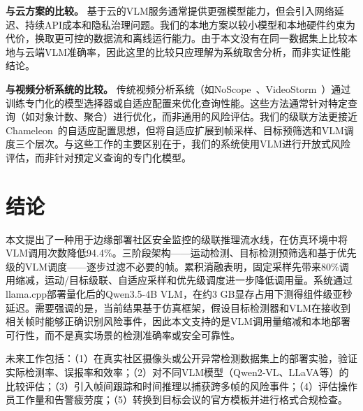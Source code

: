 \documentclass[a4paper,10pt]{ctexart}
\begin{document}
\textbf{与云方案的比较。}
基于云的VLM服务通常提供更强模型能力，但会引入网络延迟、持续API成本和隐私治理问题。我们的本地方案以较小模型和本地硬件约束为代价，换取更可控的数据流和离线运行能力。由于本文没有在同一数据集上比较本地与云端VLM准确率，因此这里的比较只应理解为系统取舍分析，而非实证性能结论。

\textbf{与视频分析系统的比较。}
传统视频分析系统（如NoScope~\cite{noscope2017}、VideoStorm~\cite{videostorm2017}）通过训练专门化的模型选择器或自适应配置来优化查询性能。这些方法通常针对特定查询（如对象计数、聚合）进行优化，而非通用的风险评估。我们的级联方法更接近Chameleon~\cite{chameleon2020}的自适应配置思想，但将自适应扩展到帧采样、目标预筛选和VLM调度三个层次。与这些工作的主要区别在于，我们的系统使用VLM进行开放式风险评估，而非针对预定义查询的专门化模型。

\section{结论}

本文提出了一种用于边缘部署社区安全监控的级联推理流水线，在仿真环境中将VLM调用次数降低94.4\%。三阶段架构——运动检测、目标检测预筛选和基于优先级的VLM调度——逐步过滤不必要的帧。累积消融表明，固定采样先带来80\%调用缩减，运动/目标级联、自适应采样和优先级调度进一步降低调用量。系统通过llama.cpp部署量化后的Qwen3.5-4B VLM，在约3 GB显存占用下测得组件级亚秒延迟。需要强调的是，当前结果基于仿真框架，假设目标检测器和VLM在接收到相关帧时能够正确识别风险事件，因此本文支持的是VLM调用量缩减和本地部署可行性，而不是真实场景的检测准确率或安全可靠性。

未来工作包括：（1）在真实社区摄像头或公开异常检测数据集上的部署实验，验证实际检测率、误报率和效率；（2）对不同VLM模型（Qwen2-VL、LLaVA等）的比较评估；（3）引入帧间跟踪和时间推理以捕获跨多帧的风险事件；（4）评估操作员工作量和告警疲劳度；（5）转换到目标会议的官方模板并进行格式合规检查。

\small


\end{document}
